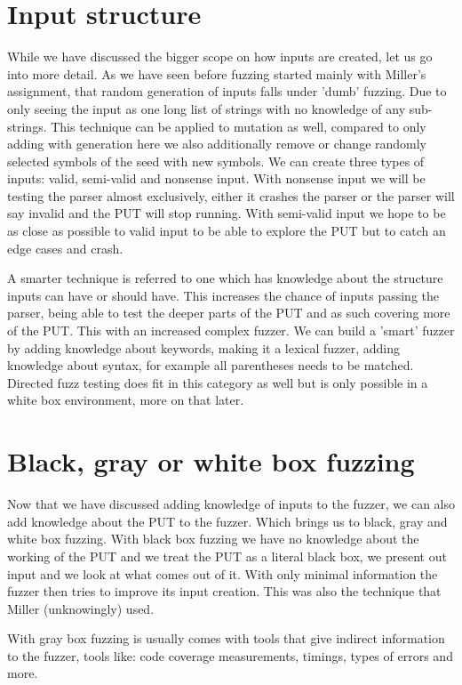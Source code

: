 \section{Input structure}
While we have discussed the bigger scope on how inputs are created, let us go into more detail. As we have seen before fuzzing started mainly with Miller's assignment, that random generation of inputs falls under 'dumb' fuzzing. Due to only seeing the input as one long list of strings with no knowledge of any sub-strings. This technique can be applied to mutation as well, compared to only adding with generation here we also additionally remove or change randomly selected symbols of the seed with new symbols. 
We can create three types of inputs: valid, semi-valid and nonsense input. With nonsense input we will be testing the parser almost exclusively, either it crashes the parser or the parser will say invalid and the PUT will stop running. With semi-valid input we hope to be as close as possible to valid input to be able to explore the PUT but to catch an edge cases and crash.

A smarter technique is referred to one which has knowledge about the structure inputs can have or should have. This increases the chance of inputs passing the parser, being able to test the deeper parts of the PUT and as such covering more of the PUT. This with an increased complex fuzzer. We can build a 'smart' fuzzer by adding knowledge about keywords, making it a lexical fuzzer, adding knowledge about syntax, for example all parentheses needs to be matched. Directed fuzz testing does fit in this category as well but is only possible in a white box environment, more on that later.

\section{Black, gray or white box fuzzing}
Now that we have discussed adding knowledge of inputs to the fuzzer, we can also add knowledge about the PUT to the fuzzer. Which brings us to black, gray and white box fuzzing. With black box fuzzing we have no knowledge about the working of the PUT and we treat the PUT as a literal black box, we present out input and we look at what comes out of it. With only minimal information the fuzzer then tries to improve its input creation. This was also the technique that Miller (unknowingly) used.
 
With gray box fuzzing is usually comes with tools that give indirect information to the fuzzer, tools like: code coverage measurements, timings, types of errors and more.

